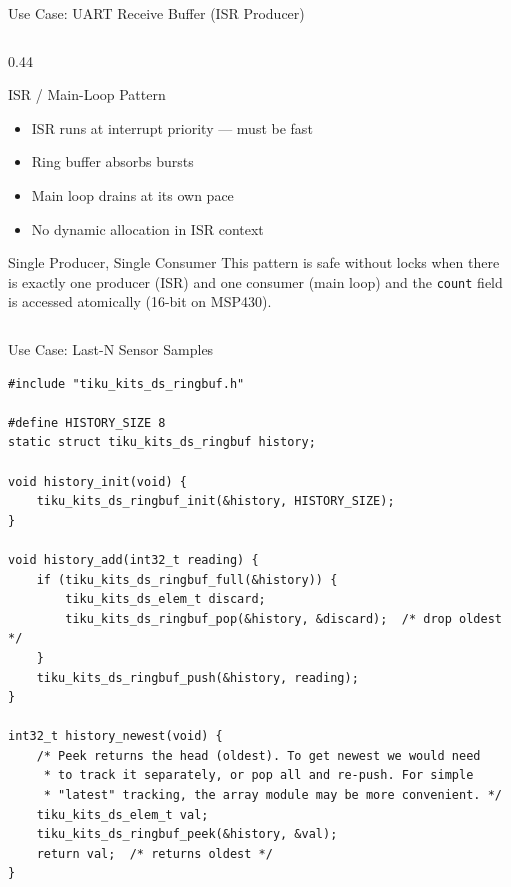 \documentclass[aspectratio=169, 10pt]{beamer}
\begin{document}
\begin{frame}[fragile]{Use Case: UART Receive Buffer (ISR Producer)}
\begin{columns}[T]
\begin{column}{0.44\textwidth}
\begin{center}
\end{center}

\vspace{0.5em}
\begin{block}{ISR / Main-Loop Pattern}
\begin{itemize}
  \item ISR runs at interrupt priority --- must be fast
  \item Ring buffer absorbs bursts
  \item Main loop drains at its own pace
  \item No dynamic allocation in ISR context
\end{itemize}
\end{block}

\begin{alertblock}{Single Producer, Single Consumer}
This pattern is safe without locks when there is exactly one
producer (ISR) and one consumer (main loop) and the
\texttt{count} field is accessed atomically (16-bit on MSP430).
\end{alertblock}
\end{column}
\end{columns}
\end{frame}

\begin{frame}[fragile]{Use Case: Last-N Sensor Samples}
\begin{lstlisting}[style=cstyle,
  title={Keep last N readings for processing}]
#include "tiku_kits_ds_ringbuf.h"

#define HISTORY_SIZE 8
static struct tiku_kits_ds_ringbuf history;

void history_init(void) {
    tiku_kits_ds_ringbuf_init(&history, HISTORY_SIZE);
}

void history_add(int32_t reading) {
    if (tiku_kits_ds_ringbuf_full(&history)) {
        tiku_kits_ds_elem_t discard;
        tiku_kits_ds_ringbuf_pop(&history, &discard);  /* drop oldest */
    }
    tiku_kits_ds_ringbuf_push(&history, reading);
}

int32_t history_newest(void) {
    /* Peek returns the head (oldest). To get newest we would need
     * to track it separately, or pop all and re-push. For simple
     * "latest" tracking, the array module may be more convenient. */
    tiku_kits_ds_elem_t val;
    tiku_kits_ds_ringbuf_peek(&history, &val);
    return val;  /* returns oldest */
}
\end{lstlisting}
\end{frame}
\end{document}
